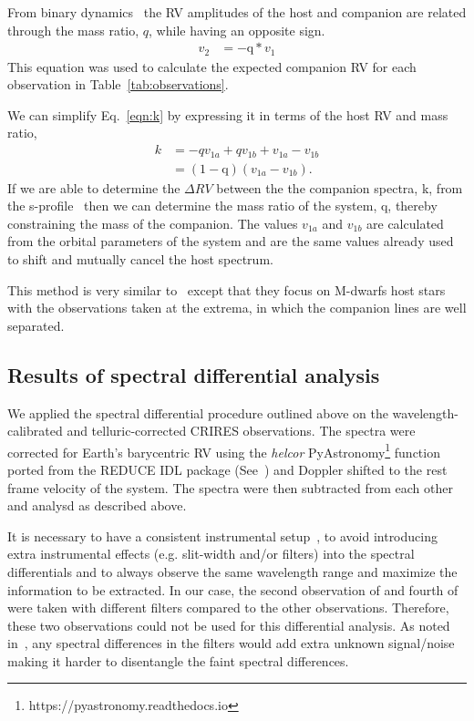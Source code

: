 From binary dynamics~\citep[e.g.][]{murray_keplerian_2010} the RV amplitudes of the host and companion are related through the mass ratio, \(q \), while having an opposite sign.
\begin{align}
	v_{2}  &= -\textrm{q} * v_{1} \label{eqn:q_relation}
\end{align}
This equation was used to calculate the expected companion RV for each observation in Table~\ref{tab:observations}.

We can simplify Eq.~\ref{eqn:k} by expressing it in terms of the host RV and mass ratio,
\begin{align}
	k &= -q v_{1a} + q v_{1b} + v_{1a} - v_{1b} \nonumber \\
	&= (1 - \textrm{q})(v_{1a} - v_{1b}). \label{eqn:k_simplified}
\end{align}
If we are able to determine the \(\Delta RV \) between the the companion spectra, k, from the s-profile~\citep[see ][]{ferluga_separating_1997} then we can determine the mass ratio of the system, q, thereby constraining the mass of the companion. The values \(v_{1a}\) and \(v_{1b}\) are calculated from the orbital parameters of the system and are the same values already used to shift and mutually cancel the host spectrum.

This method is very similar to~\citet{kostogryz_spectral_2013} except that they focus on M-dwarfs host stars with the observations taken at the extrema, in which the companion lines are well separated.


\subsection{Results of spectral differential analysis}

\label{appendix:A2}
We applied the spectral differential procedure outlined above on the wavelength-calibrated and telluric-corrected CRIRES observations. The spectra were corrected for Earth's barycentric RV using the \emph{helcor} PyAstronomy\footnote{https://pyastronomy.readthedocs.io} function ported from the REDUCE IDL package (See~\citet[][]{piskunov_new_2002}) and Doppler shifted to the rest frame velocity of the system. The spectra were then subtracted from each other and analysd as described above.

It is necessary to have a consistent instrumental setup~\citet{ferluga_separating_1997}, to avoid introducing extra instrumental effects (e.g. slit-width and/or filters) into the spectral differentials and to always observe the same wavelength range and maximize the information to be extracted. In our case, the second observation of  and fourth of  were taken with different filters compared to the other observations. Therefore, these two observations could not be used for this differential analysis. As noted in~\citep{hadrava_disentangling_2009}, any spectral differences in the filters would add extra unknown signal/noise making it harder to disentangle the faint spectral differences.


